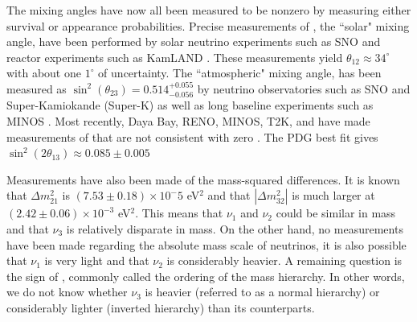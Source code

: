 The mixing angles have now all been measured to be nonzero by measuring either survival or appearance probabilities.  Precise measurements of \thetaot, the ``solar" mixing angle, have been performed by solar neutrino experiments such as SNO and reactor experiments such as KamLAND \cite{sno, kamland, pdg}.   These measurements yield $\theta_{12} \approx 34^\circ$ with about one $1^\circ$ of uncertainty.  The ``atmospheric" mixing angle, \thetatth has been measured as $\sin^2(\theta_{23}) =  0.514^{+0.055}_{-0.056}$ by neutrino observatories such as SNO and Super-Kamiokande (Super-K) as well as long baseline experiments such as MINOS \cite{sno, superK, minos, pdg}.  Most recently, Daya Bay, RENO, MINOS, T2K, and \nova have made measurements of \thetaoth that are not consistent with zero  \cite{dayaBay, reno, minos13, abe2014observation,nova2015nue}.  The PDG best fit gives $\sin^2(2 \theta_{13}) \approx 0.085 \pm 0.005$

Measurements have also been made of the mass-squared differences.  It is known that $\Delta m_{21}^2$ is $(7.53 \pm 0.18) \times 10^-5$ eV${}^2$ and that $|\Delta m_{32}^2|$ is much larger at $(2.42 \pm 0.06) \times10^{-3}$ eV${^2}$.  This means that $\nu_1$ and $\nu_2$ could be similar in mass and that $\nu_3$ is relatively disparate in mass.  On the other hand, no measurements have been made regarding the absolute mass scale of neutrinos, it is also possible that $\nu_1$ is very light and that $\nu_2$ is considerably heavier.  A remaining question is the sign of \deltamtht, commonly called the ordering of the mass hierarchy.  In other words, we do not know whether $\nu_3$ is heavier (referred to as a normal hierarchy) or considerably lighter (inverted hierarchy) than its counterparts.  

